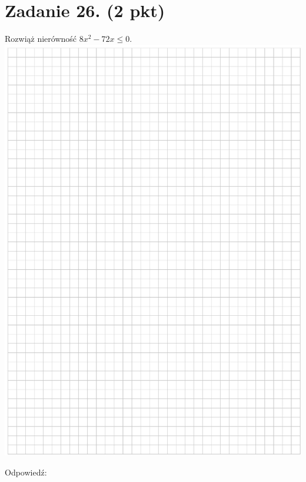 \documentclass[10pt]{article}
\begin{document}
\section*{Zadanie 26. (2 pkt)}
Rozwiąż nierówność \(8 x^{2}-72 x \leq 0\).\\
\includegraphics[max width=\textwidth, center]{2024_11_21_ad8c43efe74fa059d24eg-16}

Odpowiedź: \(\qquad\)
\end{document}
